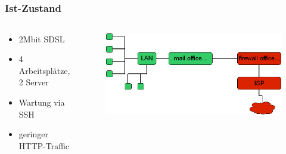 \documentclass[14pt]{beamer}
\begin{document}
\subsection*{}
\begin{frame}
\frametitle{Ist-Zustand}
\begin{columns}[c]
  \column{1.8in}

\begin{footnotesize}  \begin{itemize}
    \item 2Mbit SDSL
    \item 4 Arbeitsplätze, 2 Server
    \item Wartung via SSH
    \item geringer HTTP-Traffic
  \end{itemize}\end{footnotesize}

  \column{1.8in}
\begin{figure}[h!]
      \includegraphics[width=1\textwidth]{GFX/netzplan}
  \end{figure}
\end{columns}
\end{frame}
\end{document}
